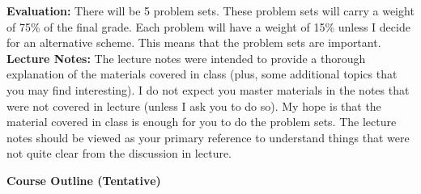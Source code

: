 \documentclass[11pt]{article}
\begin{document}
\noindent \textbf{Evaluation:} There will be 5 problem sets. These problem sets will carry a weight of 75\% of the final grade. Each problem will have a weight of 15\% unless I decide for an alternative scheme. This means that the problem sets are important. \\ 

\noindent \textbf{Lecture Notes:} The lecture notes were intended to provide a thorough explanation of the materials covered in class (plus, some additional topics that you may find interesting). I do not expect you master materials in the notes that were not covered in lecture (unless I ask you to do so). My hope is that the material covered in class is enough for you to do the problem sets. The lecture notes should be viewed as your primary reference to understand things that were not quite clear from the discussion in lecture. 

\newpage

\textbf{Course Outline (Tentative)}
\end{document}

